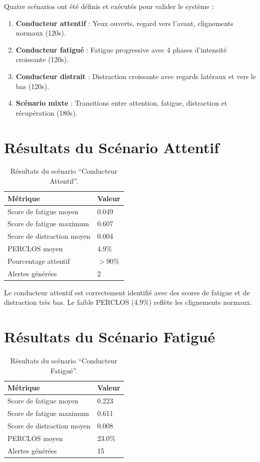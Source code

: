 \documentclass[12pt,a4paper]{report}
\begin{document}
Quatre scénarios ont été définis et exécutés pour valider le système :

\begin{enumerate}
    \item \textbf{Conducteur attentif} : Yeux ouverts, regard vers l'avant, clignements normaux (120s).
    \item \textbf{Conducteur fatigué} : Fatigue progressive avec 4 phases d'intensité croissante (120s).
    \item \textbf{Conducteur distrait} : Distraction croissante avec regards latéraux et vers le bas (120s).
    \item \textbf{Scénario mixte} : Transitions entre attention, fatigue, distraction et récupération (180s).
\end{enumerate}

\section{Résultats du Scénario Attentif}

\begin{table}[H]
    \centering
    \caption{Résultats du scénario ``Conducteur Attentif''.}
    \begin{tabular}{ll}
        \toprule
        \textbf{Métrique} & \textbf{Valeur} \\
        \midrule
        Score de fatigue moyen & 0.049 \\
        Score de fatigue maximum & 0.607 \\
        Score de distraction moyen & 0.004 \\
        PERCLOS moyen & 4.9\% \\
        Pourcentage attentif & $>$90\% \\
        Alertes générées & 2 \\
        \bottomrule
    \end{tabular}
\end{table}

Le conducteur attentif est correctement identifié avec des scores de fatigue et de distraction très bas. Le faible PERCLOS (4.9\%) reflète les clignements normaux.

\section{Résultats du Scénario Fatigué}

\begin{table}[H]
    \centering
    \caption{Résultats du scénario ``Conducteur Fatigué''.}
    \begin{tabular}{ll}
        \toprule
        \textbf{Métrique} & \textbf{Valeur} \\
        \midrule
        Score de fatigue moyen & 0.223 \\
        Score de fatigue maximum & 0.611 \\
        Score de distraction moyen & 0.008 \\
        PERCLOS moyen & 23.0\% \\
        Alertes générées & 15 \\
        \bottomrule
    \end{tabular}
\end{table}
\end{document}
